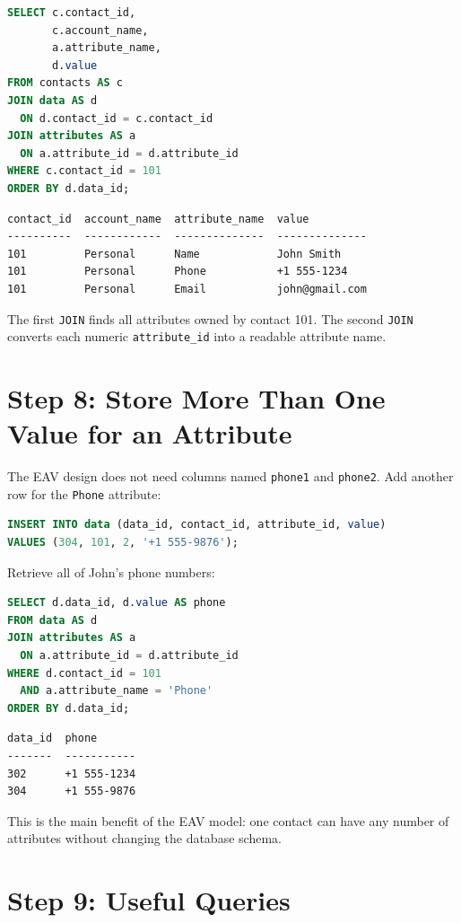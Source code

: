 \documentclass[11pt]{article}
\begin{document}
\begin{lstlisting}[language=SQL]
SELECT c.contact_id,
       c.account_name,
       a.attribute_name,
       d.value
FROM contacts AS c
JOIN data AS d
  ON d.contact_id = c.contact_id
JOIN attributes AS a
  ON a.attribute_id = d.attribute_id
WHERE c.contact_id = 101
ORDER BY d.data_id;
\end{lstlisting}

\begin{verbatim}
contact_id  account_name  attribute_name  value
----------  ------------  --------------  --------------
101         Personal      Name            John Smith
101         Personal      Phone           +1 555-1234
101         Personal      Email           john@gmail.com
\end{verbatim}

The first \texttt{JOIN} finds all attributes owned by contact 101. The second
\texttt{JOIN} converts each numeric \texttt{attribute\_id} into a readable attribute
name.

\section*{Step 8: Store More Than One Value for an Attribute}

The EAV design does not need columns named \texttt{phone1} and
\texttt{phone2}. Add another row for the \texttt{Phone} attribute:

\begin{lstlisting}[language=SQL]
INSERT INTO data (data_id, contact_id, attribute_id, value)
VALUES (304, 101, 2, '+1 555-9876');
\end{lstlisting}

Retrieve all of John's phone numbers:

\begin{lstlisting}[language=SQL]
SELECT d.data_id, d.value AS phone
FROM data AS d
JOIN attributes AS a
  ON a.attribute_id = d.attribute_id
WHERE d.contact_id = 101
  AND a.attribute_name = 'Phone'
ORDER BY d.data_id;
\end{lstlisting}

\begin{verbatim}
data_id  phone
-------  -----------
302      +1 555-1234
304      +1 555-9876
\end{verbatim}

This is the main benefit of the EAV model: one contact can have any number of
attributes without changing the database schema.

\section*{Step 9: Useful Queries}
\end{document}
